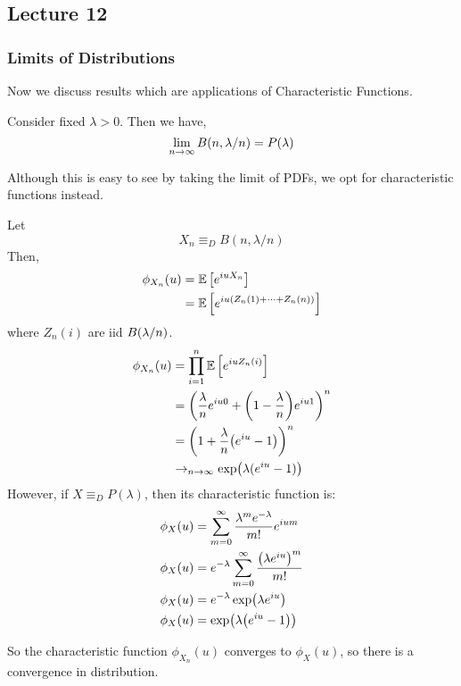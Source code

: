 \subsection{Lecture 12}

\subsubsection{Limits of Distributions}
Now we discuss results which are applications of Characteristic Functions.

\begin{theorem}
    Consider fixed $\lambda > 0$. Then we have,
    \[ \lim_{n \to \infty} B\qty(n, \lambda/n) = P(\lambda) \]

    \begin{proof*}
        Although this is easy to see by taking the limit of PDFs, we opt
        for characteristic functions instead.
        
        Let
        \[ X_n \equiv_D B(n, \lambda/n) \]
        Then,
        \begin{align*}
            \phi_{X_n}(u) &= \mathbb{E}\left[ e^{iuX_n} \right] \\
            &= \mathbb{E}\left[ e^{iu(Z_n(1) + \dots + Z_n(n))} \right]
        \end{align*}
        where $Z_n(i)$ are iid $B\qty(\lambda/n)$.
        \begin{align*}
            \phi_{X_n}(u) &= \prod_{i = 1}^n \mathbb{E}\left[ e^{iuZ_n(i)} \right]\\
            &= \qty(\frac{\lambda}{n} e^{iu0} + \qty(1 - \frac{\lambda}{n}) e^{iu1})^n \\
            &= \qty(1 + \frac{\lambda}{n}\qty(e^{iu} - 1))^n \\
            &\to_{n \to \infty} \exp(\lambda(e^{iu} - 1))
        \end{align*}
        However, if $X \equiv_D P(\lambda)$, then its characteristic function is:
        \begin{align*}
            \phi_X(u) &= \sum_{m = 0}^{\infty} \frac{\lambda^m e^{-\lambda}}{m!} e^{ium} \\
            \phi_X(u) &= e^{-\lambda} \sum_{m = 0}^{\infty} \frac{\qty(\lambda e^{iu})^m}{m!} \\
            \phi_X(u) &= e^{-\lambda} \exp(\lambda e^{iu}) \\
            \phi_X(u) &= \exp(\lambda \qty(e^{iu} - 1))
        \end{align*}

        So the characteristic function $\phi_{X_n}(u)$ converges to $\phi_{X}(u)$, so there is a convergence in distribution.
    \end{proof*}
\end{theorem}

